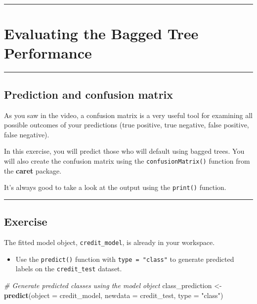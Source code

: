 \documentclass[
]{book}
\newenvironment{Shaded}{\begin{snugshade}}{\end{snugshade}}
\newcommand{\CommentTok}[1]{\textcolor[rgb]{0.56,0.35,0.01}{\textit{#1}}}
\newcommand{\DataTypeTok}[1]{\textcolor[rgb]{0.13,0.29,0.53}{#1}}
\newcommand{\KeywordTok}[1]{\textcolor[rgb]{0.13,0.29,0.53}{\textbf{#1}}}
\newcommand{\NormalTok}[1]{#1}
\newcommand{\StringTok}[1]{\textcolor[rgb]{0.31,0.60,0.02}{#1}}
\providecommand{\tightlist}{%
  \setlength{\itemsep}{0pt}\setlength{\parskip}{0pt}}
\begin{document}
\begin{center}\rule{0.5\linewidth}{0.5pt}\end{center}

\hypertarget{evaluating-the-bagged-tree-performance}{%
\section{Evaluating the Bagged Tree Performance}\label{evaluating-the-bagged-tree-performance}}

\begin{center}\rule{0.5\linewidth}{0.5pt}\end{center}

\hypertarget{prediction-and-confusion-matrix}{%
\subsection{Prediction and confusion matrix}\label{prediction-and-confusion-matrix}}

As you saw in the video, a confusion matrix is a very useful tool for examining all possible outcomes of your predictions (true positive, true negative, false positive, false negative).

In this exercise, you will predict those who will default using bagged trees. You will also create the confusion matrix using the \texttt{confusionMatrix()} function from the \textbf{caret} package.

It's always good to take a look at the output using the \texttt{print()} function.

\begin{center}\rule{0.5\linewidth}{0.5pt}\end{center}

\hypertarget{exercise-12}{%
\subsection*{Exercise}\label{exercise-12}}

The fitted model object, \texttt{credit\_model}, is already in your workspace.

\begin{itemize}
\tightlist
\item
  Use the \texttt{predict()} function with \texttt{type\ =\ "class"} to generate predicted labels on the \texttt{credit\_test} dataset.
\end{itemize}

\begin{Shaded}
\begin{Highlighting}[]
\CommentTok{# Generate predicted classes using the model object}
\NormalTok{class_prediction <-}\StringTok{ }\KeywordTok{predict}\NormalTok{(}\DataTypeTok{object =}\NormalTok{ credit_model, }
                            \DataTypeTok{newdata =}\NormalTok{ credit_test,  }
                            \DataTypeTok{type =} \StringTok{"class"}\NormalTok{) }
\end{Highlighting}
\end{Shaded}
\end{document}
